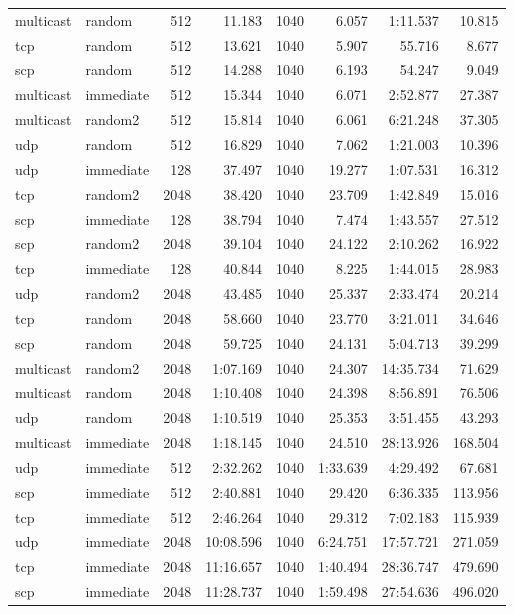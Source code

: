 \begin{tabular}{|l|l|r|r|r|r|r|r|}
multicast & random & 512 &  11.183 & 1040 & 6.057 & 1:11.537 & 10.815\\
tcp & random & 512 &  13.621 & 1040 & 5.907 & 55.716 & 8.677\\
scp & random & 512 &  14.288 & 1040 & 6.193 & 54.247 & 9.049\\
multicast & immediate & 512 &  15.344 & 1040 & 6.071 & 2:52.877 & 27.387\\
multicast & random2 & 512 &  15.814 & 1040 & 6.061 & 6:21.248 & 37.305\\
udp & random & 512 &  16.829 & 1040 & 7.062 & 1:21.003 & 10.396\\
udp & immediate & 128 &  37.497 & 1040 & 19.277 & 1:07.531 & 16.312\\
tcp & random2 & 2048 &  38.420 & 1040 & 23.709 & 1:42.849 & 15.016\\
scp & immediate & 128 &  38.794 & 1040 & 7.474 & 1:43.557 & 27.512\\
scp & random2 & 2048 &  39.104 & 1040 & 24.122 & 2:10.262 & 16.922\\
tcp & immediate & 128 &  40.844 & 1040 & 8.225 & 1:44.015 & 28.983\\
udp & random2 & 2048 &  43.485 & 1040 & 25.337 & 2:33.474 & 20.214\\
tcp & random & 2048 &  58.660 & 1040 & 23.770 & 3:21.011 & 34.646\\
scp & random & 2048 &  59.725 & 1040 & 24.131 & 5:04.713 & 39.299\\
multicast & random2 & 2048 &  1:07.169 & 1040 & 24.307 & 14:35.734 & 71.629\\
multicast & random & 2048 &  1:10.408 & 1040 & 24.398 & 8:56.891 & 76.506\\
udp & random & 2048 &  1:10.519 & 1040 & 25.353 & 3:51.455 & 43.293\\
multicast & immediate & 2048 &  1:18.145 & 1040 & 24.510 & 28:13.926 & 168.504\\
udp & immediate & 512 &  2:32.262 & 1040 & 1:33.639 & 4:29.492 & 67.681\\
scp & immediate & 512 &  2:40.881 & 1040 & 29.420 & 6:36.335 & 113.956\\
tcp & immediate & 512 &  2:46.264 & 1040 & 29.312 & 7:02.183 & 115.939\\
udp & immediate & 2048 &  10:08.596 & 1040 & 6:24.751 & 17:57.721 & 271.059\\
tcp & immediate & 2048 &  11:16.657 & 1040 & 1:40.494 & 28:36.747 & 479.690\\
scp & immediate & 2048 &  11:28.737 & 1040 & 1:59.498 & 27:54.636 & 496.020\\
\hline
\end{tabular}
